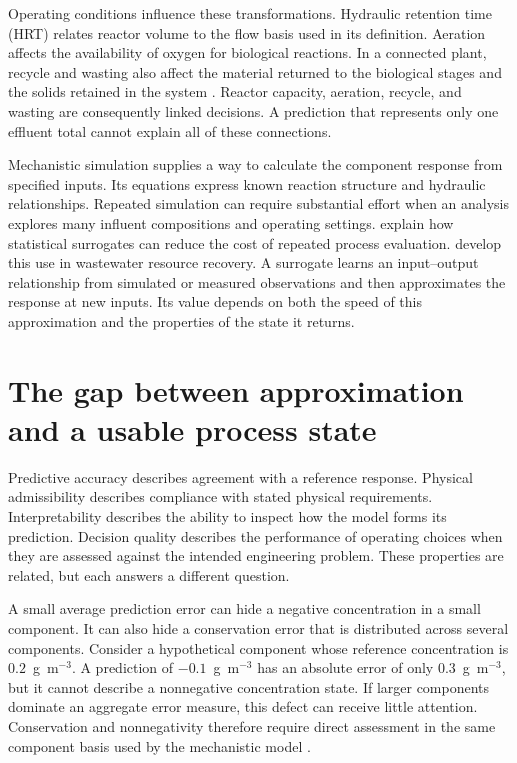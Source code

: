 Operating conditions influence these transformations. Hydraulic retention time (HRT) relates reactor volume to the flow basis used in its definition. Aeration affects the availability of oxygen for biological reactions. In a connected plant, recycle and wasting also affect the material returned to the biological stages and the solids retained in the system \citep{Henze2008}. Reactor capacity, aeration, recycle, and wasting are consequently linked decisions. A prediction that represents only one effluent total cannot explain all of these connections.

Mechanistic simulation supplies a way to calculate the component response from specified inputs. Its equations express known reaction structure and hydraulic relationships. Repeated simulation can require substantial effort when an analysis explores many influent compositions and operating settings. \citet{BhosekarIerapetritou2018} explain how statistical surrogates can reduce the cost of repeated process evaluation. \citet{Durkin2024} develop this use in wastewater resource recovery. A surrogate learns an input--output relationship from simulated or measured observations and then approximates the response at new inputs. Its value depends on both the speed of this approximation and the properties of the state it returns.

\section{The gap between approximation and a usable process state}

Predictive accuracy describes agreement with a reference response. Physical admissibility describes compliance with stated physical requirements. Interpretability describes the ability to inspect how the model forms its prediction. Decision quality describes the performance of operating choices when they are assessed against the intended engineering problem. These properties are related, but each answers a different question.

A small average prediction error can hide a negative concentration in a small component. It can also hide a conservation error that is distributed across several components. Consider a hypothetical component whose reference concentration is $0.2$~g~m$^{-3}$. A prediction of $-0.1$~g~m$^{-3}$ has an absolute error of only $0.3$~g~m$^{-3}$, but it cannot describe a nonnegative concentration state. If larger components dominate an aggregate error measure, this defect can receive little attention. Conservation and nonnegativity therefore require direct assessment in the same component basis used by the mechanistic model \citep{Hansen2024,KircherVotsmeier2025}.

